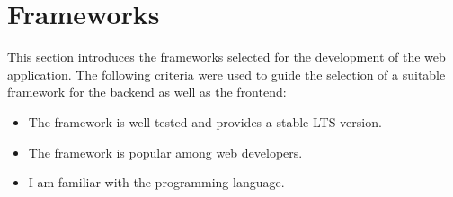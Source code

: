 \cite{methodology:webworkers}

\section{Frameworks}
\label{sec:methodology:frameworks}
This section introduces the frameworks selected for the development of the web application. The following criteria were used to guide the selection of a suitable framework for the backend as well as the frontend:
\begin{itemize}
    \item The framework is well-tested and provides a stable \ac{LTS} version.
    \item The framework is popular among web developers.
    \item I am familiar with the programming language.
\end{itemize}

